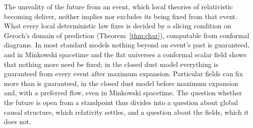 \documentclass[11pt]{article}
\theoremstyle{definition}
\begin{document}
The unreality of the future from an event, which local theories of
relativistic becoming deliver, neither implies nor excludes its being fixed
from that event. What every local deterministic law fixes is decided by a
slicing condition on Geroch's domain of prediction (Theorem~\ref{thm:char}),
computable from conformal diagrams. In most standard models nothing beyond an
event's past is guaranteed, and in Minkowski spacetime and the flat universes
a conformal scalar field shows that nothing more need be fixed; in the closed
dust model everything is guaranteed from every event after maximum
expansion. Particular fields can fix more than is guaranteed, in the closed
dust model before maximum expansion and, with a preferred flow, even in
Minkowski spacetime. The question whether the future is open from a
standpoint thus divides into a question about global causal structure, which
relativity settles, and a question about the fields, which it does not.
\end{document}
